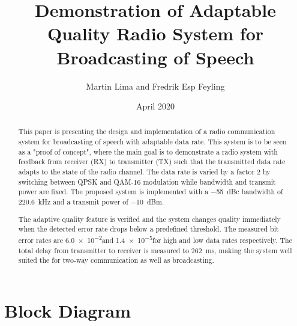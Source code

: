\documentclass[9pt,journal]{IEEEtran}
\title{Demonstration of Adaptable Quality Radio System for Broadcasting of Speech}
\author{Martin Lima and Fredrik Esp Feyling }
\date{April 2020}
\newcommand{\measBW}{220.6} %
\newcommand{\measPWR}{-10} %
\newcommand{\measDelay}{262} %
\newcommand{\measBERQAMGood}{\SI{6.0e-2}{\;}}
\newcommand{\measBERQPSKBad}{\SI{1.4e-5}{\;}}
\begin{document}
\maketitle
\begin{abstract} 
This paper is presenting the design and implementation of a radio communication system for broadcasting of speech with adaptable data rate. This system is to be seen as a "proof of concept", where the main goal is to demonstrate a radio system with feedback from receiver (RX) to transmitter (TX) such that the transmitted data rate adapts to the state of the radio channel. The data rate is varied by a factor 2 by switching between QPSK and QAM-16 modulation while bandwidth and transmit power are fixed. The proposed system is implemented with a \SI{-55}{dBc} bandwidth of \SI{\measBW}{\kilo\hertz} and a transmit power of \SI{\measPWR}{dBm}.

The adaptive quality feature is verified and the system changes quality immediately when the detected error rate drops below a predefined threshold. The measured bit error rates are \measBERQAMGood  and \measBERQPSKBad for high and low data rates respectively. The total delay from transmitter to receiver is measured to \SI{\measDelay}{\milli\second}, making the system well suited the for two-way communication as well as broadcasting. 
\end{abstract}







\newpage











\appendices

\section{Block Diagram}
\label{a:block_diagram}


\end{document}
